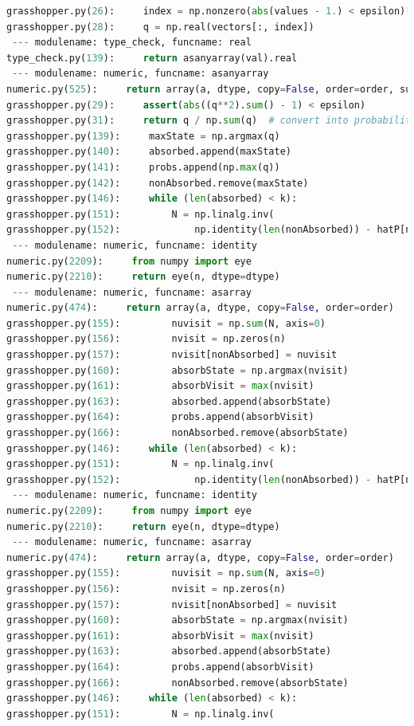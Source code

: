 \documentclass[11pt]{article}
\begin{document}
\begin{lstlisting}[breaklines,language=Python]
grasshopper.py(26):     index = np.nonzero(abs(values - 1.) < epsilon)[0][0]
grasshopper.py(28):     q = np.real(vectors[:, index])
 --- modulename: type_check, funcname: real
type_check.py(139):     return asanyarray(val).real
 --- modulename: numeric, funcname: asanyarray
numeric.py(525):     return array(a, dtype, copy=False, order=order, subok=True)
grasshopper.py(29):     assert(abs((q**2).sum() - 1) < epsilon)
grasshopper.py(31):     return q / np.sum(q)  # convert into probability distribution
grasshopper.py(139):     maxState = np.argmax(q)
grasshopper.py(140):     absorbed.append(maxState)
grasshopper.py(141):     probs.append(np.max(q))
grasshopper.py(142):     nonAbsorbed.remove(maxState)
grasshopper.py(146):     while (len(absorbed) < k):
grasshopper.py(151):         N = np.linalg.inv(
grasshopper.py(152):             np.identity(len(nonAbsorbed)) - hatP[nonAbsorbed, nonAbsorbed])
 --- modulename: numeric, funcname: identity
numeric.py(2209):     from numpy import eye
numeric.py(2210):     return eye(n, dtype=dtype)
 --- modulename: numeric, funcname: asarray
numeric.py(474):     return array(a, dtype, copy=False, order=order)
grasshopper.py(155):         nuvisit = np.sum(N, axis=0)
grasshopper.py(156):         nvisit = np.zeros(n)
grasshopper.py(157):         nvisit[nonAbsorbed] = nuvisit
grasshopper.py(160):         absorbState = np.argmax(nvisit)
grasshopper.py(161):         absorbVisit = max(nvisit)
grasshopper.py(163):         absorbed.append(absorbState)
grasshopper.py(164):         probs.append(absorbVisit)
grasshopper.py(166):         nonAbsorbed.remove(absorbState)
grasshopper.py(146):     while (len(absorbed) < k):
grasshopper.py(151):         N = np.linalg.inv(
grasshopper.py(152):             np.identity(len(nonAbsorbed)) - hatP[nonAbsorbed, nonAbsorbed])
 --- modulename: numeric, funcname: identity
numeric.py(2209):     from numpy import eye
numeric.py(2210):     return eye(n, dtype=dtype)
 --- modulename: numeric, funcname: asarray
numeric.py(474):     return array(a, dtype, copy=False, order=order)
grasshopper.py(155):         nuvisit = np.sum(N, axis=0)
grasshopper.py(156):         nvisit = np.zeros(n)
grasshopper.py(157):         nvisit[nonAbsorbed] = nuvisit
grasshopper.py(160):         absorbState = np.argmax(nvisit)
grasshopper.py(161):         absorbVisit = max(nvisit)
grasshopper.py(163):         absorbed.append(absorbState)
grasshopper.py(164):         probs.append(absorbVisit)
grasshopper.py(166):         nonAbsorbed.remove(absorbState)
grasshopper.py(146):     while (len(absorbed) < k):
grasshopper.py(151):         N = np.linalg.inv(

\end{lstlisting}
\end{document}
